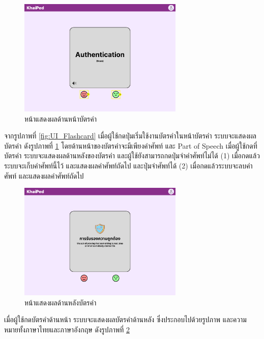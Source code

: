 \documentclass[12pt,oneside,openright,a4paper]{cpe-thai-project}
\begin{document}
\pagebreak
\begin{figure}[!h]\centering
	\includegraphics[width=0.7\textwidth, keepaspectratio=true]{image/chap3/ui/flashcard/Flashcard - Show Card.png}
	\caption{หน้าแสดงผลด้านหน้าบัตรคำ}\label{fig:UI_ShowCard}
\end{figure}
\hspace{1cm}
จากรูปภาพที่ \ref{fig:UI_Flashcard} เมื่อผู้ใช้กดปุ่มเริ่มใช้งานบัตรคำในหน้าบัตรคำ ระบบจะแสดงผลบัตรคำ ดังรูปภาพที่ \ref{fig:UI_ShowCard} โดยด้านหน้าของบัตรคำจะมีเพียงคำศัพท์ และ Part of Speech เมื่อผู้ใช้กดที่บัตรคำ
ระบบจะแสดงผลด้านหลังของบัตรคำ และผู้ใช้ยังสามารถกดปุ่มจำคำศัพท์ไม่ได้ (1) เมื่อกดแล้วระบบจะเก็บคำศัพท์นี้ไว้ และแสดงผลคำศัพท์ถัดไป และปุ่มจำศัพท์ได้ (2)
เมื่อกดแล้วระบบจะลบคำศัพท์ และแสดงผลคำศัพท์ถัดไป

\begin{figure}[!h]\centering
	\includegraphics[width=0.7\textwidth, keepaspectratio=true]{image/chap3/ui/flashcard/Flashcard - Flip Card.png}
	\caption{หน้าแสดงผลด้านหลังบัตรคำ}\label{fig:UI_FlipCard}
\end{figure}
\hspace{1cm}
เมื่อผู้ใช้กดบัตรคำด้านหน้า ระบบจะแสดงผลบัตรคำด้านหลัง ซึ่งประกอบไปด้วยรูปภาพ และความหมายทั้งภาษาไทยและภาษาอังกฤษ ดังรูปภาพที่ \ref{fig:UI_FlipCard}
\end{document}

